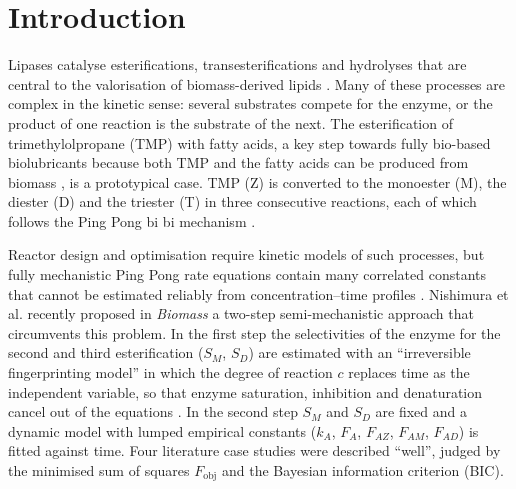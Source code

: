 \section{Introduction}
Lipases catalyse esterifications, transesterifications and hydrolyses that are central to the valorisation of biomass-derived lipids \cite{gamayurova2021,sousa2021,paiva2000}. Many of these processes are complex in the kinetic sense: several substrates compete for the enzyme, or the product of one reaction is the substrate of the next. The esterification of trimethylolpropane (TMP) with fatty acids, a key step towards fully bio-based biolubricants because both TMP and the fatty acids can be produced from biomass \cite{sayed2025,lennen2013}, is a prototypical case. TMP (Z) is converted to the monoester (M), the diester (D) and the triester (T) in three consecutive reactions, each of which follows the Ping Pong bi bi mechanism \cite{cleland1963,cornishbowden2012}.

Reactor design and optimisation require kinetic models of such processes, but fully mechanistic Ping Pong rate equations contain many correlated constants that cannot be estimated reliably from concentration--time profiles \cite{alhaque2012,bornadel2013}. Nishimura et al. \cite{nishimura2026} recently proposed in \emph{Biomass} a two-step semi-mechanistic approach that circumvents this problem. In the first step the selectivities of the enzyme for the second and third esterification ($S_M$, $S_D$) are estimated with an ``irreversible fingerprinting model'' in which the degree of reaction $c$ replaces time as the independent variable, so that enzyme saturation, inhibition and denaturation cancel out of the equations \cite{mitchell2022a,mitchell2022b,mitchell2023}. In the second step $S_M$ and $S_D$ are fixed and a dynamic model with lumped empirical constants ($k_A$, $F_A$, $F_{AZ}$, $F_{AM}$, $F_{AD}$) is fitted against time. Four literature case studies \cite{akerman2011,bornadel2013,tao2015,mao2024} were described ``well'', judged by the minimised sum of squares $F_\mathrm{obj}$ and the Bayesian information criterion (BIC).

